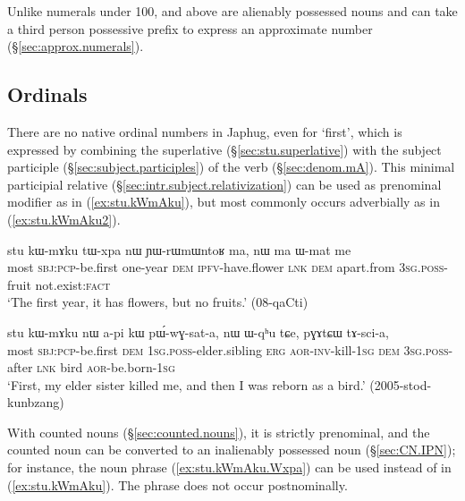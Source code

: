  
Unlike numerals under 100,  and above are alienably possessed nouns and can take a third person possessive prefix  to express an approximate number (§\ref{sec:approx.numerals}).

 \subsection{Ordinals} \label{sec:ordinals}
There are no native ordinal numbers in Japhug, even for `first', which is expressed by combining the superlative  (§\ref{sec:stu.superlative}) with the subject participle (§\ref{sec:subject.participles}) of the verb  (§\ref{sec:denom.mA}). This minimal participial relative  (§\ref{sec:intr.subject.relativization}) can be used as prenominal modifier as in (\ref{ex:stu.kWmAku}), but most commonly occurs adverbially as in (\ref{ex:stu.kWmAku2}).   
 
\begin{exe}
\ex  \label{ex:stu.kWmAku}
\gll stu kɯ-mɤku tɯ-xpa nɯ ɲɯ-rɯmɯntoʁ ma, nɯ ma ɯ-mat me \\
most \textsc{sbj}:\textsc{pcp}-be.first one-year \textsc{dem} \textsc{ipfv}-have.flower \textsc{lnk} \textsc{dem} apart.from \textsc{3sg}.\textsc{poss}-fruit not.exist:\textsc{fact} \\
\glt `The first year, it has flowers, but no fruits.' (08-qaCti)
\end{exe}
  
\begin{exe}
\ex  \label{ex:stu.kWmAku2}
\gll stu kɯ-mɤku nɯ a-pi kɯ pɯ́-wɣ-sat-a,  nɯ ɯ-qʰu tɕe, pɣɤtɕɯ tɤ-sci-a, \\
most \textsc{sbj}:\textsc{pcp}-be.first \textsc{dem} \textsc{1sg}.\textsc{poss}-elder.sibling \textsc{erg} \textsc{aor}-\textsc{inv}-kill-\textsc{1sg} \textsc{dem} \textsc{3sg}.\textsc{poss}-after \textsc{lnk} bird \textsc{aor}-be.born-\textsc{1sg} \\
\glt `First, my elder sister killed me, and then I was reborn as a bird.' (2005-stod-kunbzang)
\end{exe}

With counted nouns (§\ref{sec:counted.nouns}), it is strictly prenominal, and the counted noun can be converted to an inalienably possessed noun (§\ref{sec:CN.IPN}); for instance, the noun phrase (\ref{ex:stu.kWmAku.Wxpa}) can be used instead of  in (\ref{ex:stu.kWmAku}). The phrase  does not occur postnominally.

